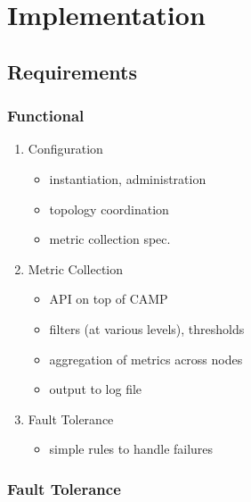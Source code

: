 \chapter{Implementation}
\label{implementation}

\section{Requirements}

\subsection{Functional}

\begin{enumerate}

\item Configuration
      \begin{itemize}
      \item instantiation, administration
      \item topology coordination
      \item metric collection spec.
      \end{itemize}

\item Metric Collection
      \begin{itemize}
      \item \dcamp API on top of CAMP
      \item filters (at various levels), thresholds
      \item aggregation of metrics across nodes
      \item output to log file
      \end{itemize}

\item Fault Tolerance
      \begin{itemize}
      \item simple rules to handle failures
      \end{itemize}

\end{enumerate}

\subsection{Fault Tolerance}

